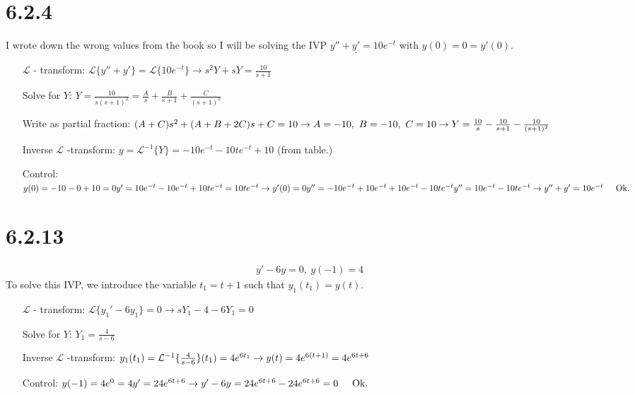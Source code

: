 \documentclass[11pt,a4paper]{article}
\newcommand{\Laplace}{\mathcal{L}}
\begin{document}
\section*{6.2.4}
I wrote down the wrong values from the book so I will be solving the IVP $y'' + \underline{y'} = 10e^{-t}$ with $y(0) = 0 = y'(0)$. \\
\begin{itemize}[leftmargin=4.0cm,labelsep=0.5cm]
\item[$\Laplace$ - transform:]
	$\Laplace\{y''+y'\} = \Laplace\{10e^{-t}\}
	\rightarrow s^2 Y + sY = \frac{10}{s+1}$
\item[Solve for $Y$:]
	$Y = \frac{10}{s(s+1)^2}
	= \frac{A}{s} + \frac{B}{s+1} + \frac{C}{(s+1)^2}$
\item[Write as partial fraction:]
	$(A+C)s^2 + (A+B+2C)s + C = 10 \\
	\rightarrow A=-10,\ B=-10,\ C = 10 \\
	\rightarrow Y = \frac{10}{s} - \frac{10}{s+1} - \frac{10}{(s+1)^2}$
\item[Inverse $\Laplace$ -transform:]
	$ y = \Laplace^{-1}\{Y\} = -10e^{-t} - 10te^{-t} + 10$ (from table.)
\item[Control:]
	$ y(0) = -10 - 0 + 10 = 0 \\
	y' = 10e^{-t} - 10e^{-t} + 10te^{-t} = 10te^{-t} \\
	\rightarrow y'(0) = 0 \\
	y'' = - 10e^{-t} + 10e^{-t} + 10e^{-t} - 10te^{-t} \\
	y'' = 10e^{-t} - 10te^{-t} \\
	\rightarrow y'' + y' = 10e^{-t} \hspace*{0.5cm} \text{Ok.}$
\end{itemize}

\section*{6.2.13}
\begin{align*}
	y' - 6y = 0,\ y(-1) = 4
\end{align*}
To solve this IVP, we introduce the variable $t_1 = t + 1$ such that $y_1(t_1) = y(t)$.
\begin{itemize}[leftmargin=4.0cm,labelsep=0.5cm]
\item[$\Laplace$ - transform:]
	$\Laplace\{y_1' - 6y_1\} = 0
	\rightarrow sY_1 - 4 - 6Y_1 = 0$
\item[Solve for $Y$:]
	$Y_1 = \frac{4}{s-6}$
\item[Inverse $\Laplace$ -transform:]
	$y_1(t_1) = \Laplace^{-1}\{\frac{4}{s-6}\}(t_1) = 4e^{6t_1} \\
	\rightarrow y(t) = 4e^{6(t+1)} = 4e^{6t+6}$
\item[Control:]
	$y(-1) = 4e^0 = 4 \\
	y' = 24e^{6t+6} \\
	\rightarrow y' - 6y = 24e^{6t+6} - 24e^{6t+6} = 0 
	\hspace*{0.5cm} \text{Ok.}$
\end{itemize}
\end{document}
